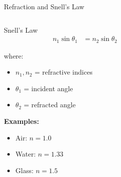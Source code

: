 \begin{frame}{Refraction and Snell's Law}
    \begin{columns}
        \begin{column}{0.5\textwidth}
            \begin{mathbox}{Snell's Law}
                \begin{align}
                    n_1 \sin\theta_1 & = n_2 \sin\theta_2
                \end{align}

                where:
                \begin{itemize}
                    \item $n_1, n_2$ = refractive indices
                    \item $\theta_1$ = incident angle
                    \item $\theta_2$ = refracted angle
                \end{itemize}

                \vspace{0.3cm}
                \textbf{Examples:}
                \begin{itemize}
                    \item Air: $n = 1.0$
                    \item Water: $n = 1.33$
                    \item Glass: $n = 1.5$
                \end{itemize}
            \end{mathbox}
        \end{column}
        \begin{column}{0.5\textwidth}
\end{column}
\end{columns}
\end{frame}

